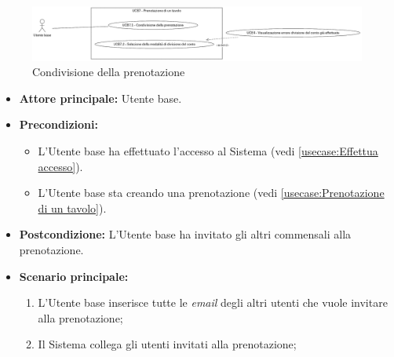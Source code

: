\label{usecase:Condivisione della prenotazione}

\begin{figure}[h]
	\centering
	\includegraphics[width=0.99\textwidth]{./uml/UCB7.1-UCB7.2.png} 
	\caption{Condivisione della prenotazione}
	\label{fig:UCB9}
  \end{figure}

\begin{itemize}
	\item \textbf{Attore principale:} Utente base.

	\item \textbf{Precondizioni:}
	\begin{itemize}
		\item L'Utente base ha effettuato l'accesso al Sistema (vedi \autoref{usecase:Effettua accesso}).
		\item L'Utente base sta creando una prenotazione (vedi \autoref{usecase:Prenotazione di un tavolo}).
	\end{itemize}

	\item \textbf{Postcondizione:}
	      L'Utente base ha invitato gli altri commensali alla prenotazione.

	\item \textbf{Scenario principale:}
	      \begin{enumerate}
		      \item L'Utente base inserisce tutte le \textit{email} degli altri utenti che vuole invitare alla prenotazione;
		      \item Il Sistema collega gli utenti invitati alla prenotazione;
	      \end{enumerate}
\end{itemize}
